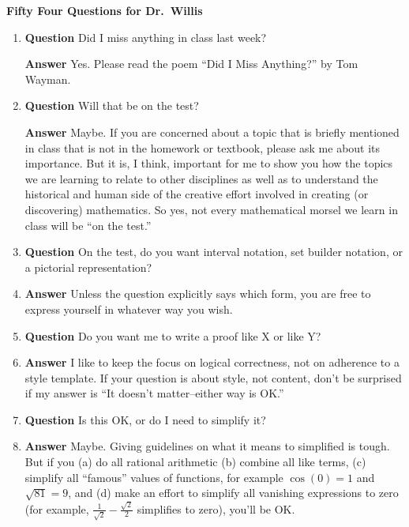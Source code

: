 \documentclass[12pt]{article}
\newcounter{ex}\setcounter{ex}{0}
\begin{document}
\begin{flushleft}
  \large
\textbf{Fifty Four Questions for Dr.\ Willis}
\end{flushleft}  
\normalsize
\begin{enumerate}

\item \textbf{Question} Did I miss anything in class last week?

\textbf{Answer} Yes.  Please read  the poem “Did I Miss Anything?” by Tom Wayman.  

\item \textbf{Question} Will that be on the test?

\textbf{Answer} Maybe. If you are concerned about a topic that is briefly
mentioned in class that is not in the homework or textbook, please ask me
about its importance. But it is, I think, important for me to 
show you how the topics we are learning to relate to other disciplines  
as well as to understand the historical and human side of the
creative effort involved in creating (or discovering) mathematics. So yes,
not every mathematical morsel we learn in class will be ``on the test.''

\item \textbf{Question} On the test, do you want interval notation, set builder
notation, or a pictorial representation?

\item  \textbf{Answer} Unless the question explicitly says which form,
you are free to express yourself in whatever way you wish.

\item \textbf{Question} Do you want me to write a proof like X or 
like Y?

\item  \textbf{Answer} I like to keep the focus on logical 
correctness, not on adherence to a style template. If your question is about
style, not content, don't be surprised if my answer is ``It doesn't 
matter--either way is OK.'' 

\item \textbf{Question} Is this OK, or do I need to simplify it?

\item  \textbf{Answer} Maybe. Giving guidelines on what it means to 
  simplified is tough. But if you  (a) do all rational arithmetic (b) combine
  all like terms, (c) simplify all ``famous'' values of functions, 
  for example $\cos(0)=1$ and $\sqrt{81} = 9$, and (d) make an effort
  to simplify all vanishing expressions to zero (for example, 
  $\frac{1}{\sqrt{2}} - \frac{\sqrt{2}}{2}$ simplifies to zero), you'll be OK.


\end{enumerate}
\end{document}
